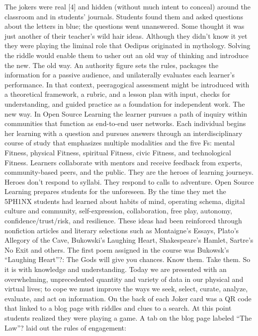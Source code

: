 The jokers were real {[}4{]} and hidden (without much intent to conceal)
around the classroom and in students' journals. Students found them and
asked questions about the letters in blue; the questions went
unanswered. Some thought it was just another of their teacher's wild
hair ideas. Although they didn't know it yet they were playing the
liminal role that Oedipus originated in mythology. Solving the riddle
would enable them to usher out an old way of thinking and introduce the
new. The old way. An authority figure sets the rules, packages the
information for a passive audience, and unilaterally evaluates each
learner's performance. In that context, peeragogical assessment might be
introduced with a theoretical framework, a rubric, and a lesson plan
with input, checks for understanding, and guided practice as a
foundation for independent work. The new way. In Open Source Learning
the learner pursues a path of inquiry within communities that function
as end-to-end user networks. Each individual begins her learning with a
question and pursues answers through an interdisciplinary course of
study that emphasizes multiple modalities and the five Fs: mental
Fitness, physical Fitness, spiritual Fitness, civic Fitness, and
technological Fitness. Learners collaborate with mentors and receive
feedback from experts, community-based peers, and the public. They are
the heroes of learning journeys. Heroes don't respond to syllabi. They
respond to calls to adventure. Open Source Learning prepares students
for the unforeseen. By the time they met the 5PH1NX students had learned
about habits of mind, operating schema, digital culture and community,
self-expression, collaboration, free play, autonomy,
confidence/trust/risk, and resilience. These ideas had been reinforced
through nonfiction articles and literary selections such as Montaigne's
Essays, Plato's Allegory of the Cave, Bukowski's Laughing Heart,
Shakespeare's Hamlet, Sartre's No Exit and others. The first poem
assigned in the course was Bukowsk's ``Laughing Heart''?: The Gods will
give you chances. Know them. Take them. So it is with knowledge and
understanding. Today we are presented with an overwhelming,
unprecedented quantity and variety of data in our physical and virtual
lives; to cope we must improve the ways we seek, select, curate,
analyze, evaluate, and act on information. On the back of each Joker
card was a QR code that linked to a blog page with riddles and clues to
a search. At this point students realized they were playing a game. A
tab on the blog page labeled ``The Law''? laid out the rules of
engagement:

